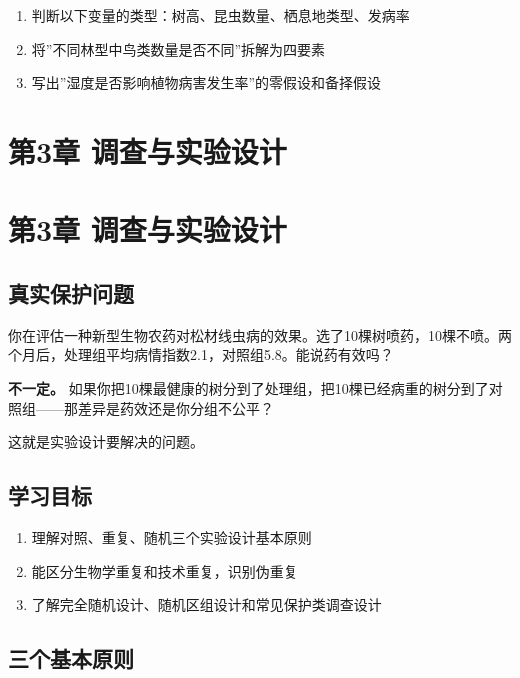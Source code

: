 \documentclass[
  letterpaper,
]{scrbook}
\providecommand{\tightlist}{%
  \setlength{\itemsep}{0pt}\setlength{\parskip}{0pt}}
\begin{document}
\begin{enumerate}
\def\labelenumi{\arabic{enumi}.}
\tightlist
\item
  判断以下变量的类型：树高、昆虫数量、栖息地类型、发病率
\item
  将''不同林型中鸟类数量是否不同''拆解为四要素
\item
  写出''湿度是否影响植物病害发生率''的零假设和备择假设
\end{enumerate}

\chapter{第3章
调查与实验设计}\label{ux7b2c3ux7ae0-ux8c03ux67e5ux4e0eux5b9eux9a8cux8bbeux8ba1}

\chapter{第3章
调查与实验设计}\label{ux7b2c3ux7ae0-ux8c03ux67e5ux4e0eux5b9eux9a8cux8bbeux8ba1-1}

\section{真实保护问题}\label{ux771fux5b9eux4fddux62a4ux95eeux9898-2}

你在评估一种新型生物农药对松材线虫病的效果。选了10棵树喷药，10棵不喷。两个月后，处理组平均病情指数2.1，对照组5.8。能说药有效吗？

\textbf{不一定。}
如果你把10棵最健康的树分到了处理组，把10棵已经病重的树分到了对照组------那差异是药效还是你分组不公平？

这就是实验设计要解决的问题。

\section{学习目标}\label{ux5b66ux4e60ux76eeux6807-2}

\begin{enumerate}
\def\labelenumi{\arabic{enumi}.}
\tightlist
\item
  理解对照、重复、随机三个实验设计基本原则
\item
  能区分生物学重复和技术重复，识别伪重复
\item
  了解完全随机设计、随机区组设计和常见保护类调查设计
\end{enumerate}

\section{三个基本原则}\label{ux4e09ux4e2aux57faux672cux539fux5219}
\end{document}
